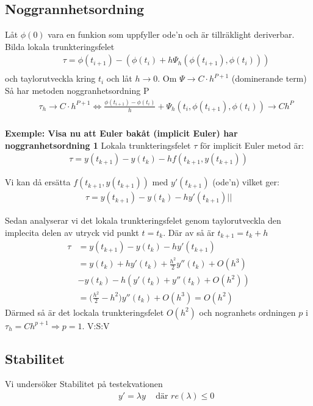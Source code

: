 \subsection{Noggrannhetsordning}
Låt $\phi(0)$ vara en funkion som uppfyller ode'n och är tillräklight deriverbar.
Bilda lokala trunkteringsfelet
\begin{align*}
  &\quad \tau = \phi(t_{i+1})-(\phi(t_i)+h\Psi_h(\phi(t_{i+1}),\phi(t_i))) \\
\end{align*}
och taylorutveckla kring $t_i$ och låt $h\to0$. 
Om $\Psi\to{C\cdot{h^{P+1}}}$ (dominerande term)
Så har metoden noggranhetsordning P
\begin{align*}
  &\quad \tau_h\to{C\cdot{h^{P+1}}} \Leftrightarrow \frac{\phi(t_{i+1})-\phi(t_i)}{h}+\Psi_h(t_i,\phi(t_{i+1}),\phi(t_i))\to{Ch^P} \\
\end{align*}


\textbf{Exemple: Visa nu att Euler bakåt (implicit Euler) har noggranhetsordning 1} \newline
Lokala trunkteringsfelet $\tau$ för implicit Euler metod är:
\begin{align*}
  \tau = y(t_{k+1})-y(t_k)-hf(t_{k+1},y(t_{k+1}))
\end{align*}

Vi kan då ersätta $f(t_{k+1},y(t_{k+1}))$ med $y'(t_{k+1})$ (ode'n) vilket ger:
\begin{align*}
  \tau = y(t_{k+1})-y(t_k)-hy'(t_{k+1})||
\end{align*}

Sedan analyserar vi det lokala trunkteringsfelet genom taylorutveckla
den implecita delen av utryck vid punkt $t=t_k$.
Där av så är $t_{k+1}=t_k+h$
\begin{align*}
  \tau &= y(t_{k+1})-y(t_k)-hy'(t_{k+1})  \\
  &= y(t_k)+hy'(t_k)+\frac{h^2}{2}y''(t_k)+O(h^3) \\
  &-y(t_k)-h(y'(t_k)+y''(t_k)+O(h^2)) \\
  &= \big( \frac{h^2}{2} - h^2 \big)y''(t_k)+O(h^3) = O(h^2)
\end{align*}
Därmed så är det lockala trunkteringsfelet $O(h^2)$ och nogranhets ordningen
$p$ i $\tau_{h}=Ch^{p+1}\Rightarrow p=1$. V:S:V 

\newpage

\subsection{Stabilitet}
Vi undersöker Stabilitet på testekvationen
\begin{align*}
  &\quad  y'=\lambda y \;\;\; \text{ där } re(\lambda)\leq 0 \\
\end{align*}

